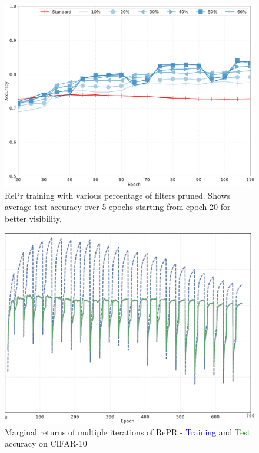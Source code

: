 \begin{figure}[]
\center
    \includegraphics[width=0.8\linewidth]{figures/repr/percentage_pruned_X.pdf}
   \caption[Percentage of filters pruned]{RePr training with various percentage of filters pruned. Shows average test accuracy over 5 epochs starting from epoch 20 for better visibility.}
   \label{fig:ablation_percent}
\end{figure}


\begin{figure}[]
\center
   \includegraphics[width=0.75\linewidth]{figures/repr/marginal_returns_no_y.pdf}
   \caption[Multiple Iterations of RePr]{Marginal returns of multiple iterations of RePR - \textcolor{blue}{Training} and \textcolor{green}{Test} accuracy on CIFAR-10}
   \label{fig:ablation_N_repeat}
\end{figure}



